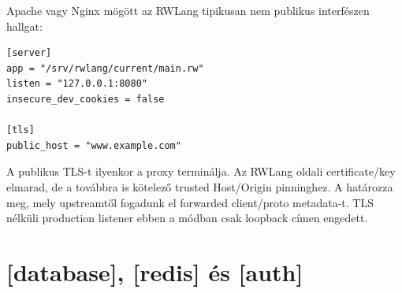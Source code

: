 Apache vagy Nginx mögött az RWLang tipikusan nem publikus interfészen hallgat:

\begin{lstlisting}
[server]
app = "/srv/rwlang/current/main.rw"
listen = "127.0.0.1:8080"
insecure_dev_cookies = false

[tls]
public_host = "www.example.com"
\end{lstlisting}

A publikus TLS-t ilyenkor a proxy terminálja. Az RWLang oldali certificate/key elmarad, de a  továbbra is kötelező trusted Host/Origin pinninghez. A  határozza meg, mely upstreamtől fogadunk el forwarded client/proto metadata-t. TLS nélküli production listener ebben a módban csak loopback címen engedett.

\section{[database], [redis] és [auth]}

